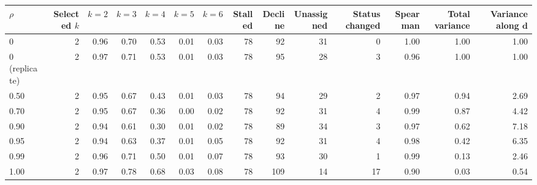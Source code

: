 \begin{tabular}{lrrrrrrrrrrrrr}
\toprule
$\rho$ & Selected $k$ & $k = 2$ & $k = 3$ & $k = 4$ & $k = 5$ & $k = 6$ & Stalled & Decline & Unassigned & Status changed & Spearman & Total variance & Variance along $\mathbf{d}$ \\
\midrule
0 & 2 & 0.96 & 0.70 & 0.53 & 0.01 & 0.03 & 78 &  92 & 31 &  0 & 1.00 & 1.00 & 1.00 \\
0 (replicate) & 2 & 0.97 & 0.71 & 0.53 & 0.01 & 0.03 & 78 &  95 & 28 &  3 & 0.96 & 1.00 & 1.00 \\
0.50 & 2 & 0.95 & 0.67 & 0.43 & 0.01 & 0.03 & 78 &  94 & 29 &  2 & 0.97 & 0.94 & 2.69 \\
0.70 & 2 & 0.95 & 0.67 & 0.36 & 0.00 & 0.02 & 78 &  92 & 31 &  4 & 0.99 & 0.87 & 4.42 \\
0.90 & 2 & 0.94 & 0.61 & 0.30 & 0.01 & 0.02 & 78 &  89 & 34 &  3 & 0.97 & 0.62 & 7.18 \\
0.95 & 2 & 0.94 & 0.63 & 0.37 & 0.01 & 0.05 & 78 &  92 & 31 &  4 & 0.98 & 0.42 & 6.35 \\
0.99 & 2 & 0.96 & 0.71 & 0.50 & 0.01 & 0.07 & 78 &  93 & 30 &  1 & 0.99 & 0.13 & 2.46 \\
1.00 & 2 & 0.97 & 0.78 & 0.68 & 0.03 & 0.08 & 78 & 109 & 14 & 17 & 0.90 & 0.03 & 0.54 \\
\bottomrule
\end{tabular}
